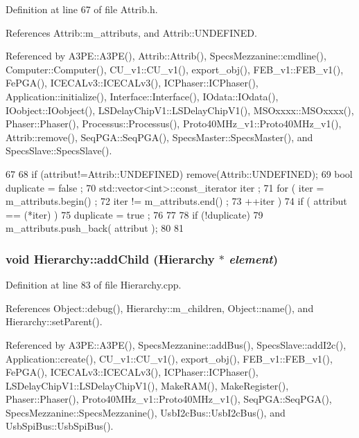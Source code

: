 Definition at line 67 of file Attrib.h.

References Attrib::m\_\-attributs, and Attrib::UNDEFINED.

Referenced by A3PE::A3PE(), Attrib::Attrib(), SpecsMezzanine::cmdline(), Computer::Computer(), CU\_\-v1::CU\_\-v1(), export\_\-obj(), FEB\_\-v1::FEB\_\-v1(), FePGA(), ICECALv3::ICECALv3(), ICPhaser::ICPhaser(), Application::initialize(), Interface::Interface(), IOdata::IOdata(), IOobject::IOobject(), LSDelayChipV1::LSDelayChipV1(), MSOxxxx::MSOxxxx(), Phaser::Phaser(), Processus::Processus(), Proto40MHz\_\-v1::Proto40MHz\_\-v1(), Attrib::remove(), SeqPGA::SeqPGA(), SpecsMaster::SpecsMaster(), and SpecsSlave::SpecsSlave().


\begin{DoxyCode}
67                             {
68     if (attribut!=Attrib::UNDEFINED) remove(Attrib::UNDEFINED);
69     bool duplicate = false ;
70     std::vector<int>::const_iterator iter ;
71     for ( iter  = m_attributs.begin() ;
72           iter != m_attributs.end()   ;
73           ++iter ) {
74       if ( attribut == (*iter) ) {
75         duplicate = true ;
76       }
77     }
78     if (!duplicate) {
79       m_attributs.push_back( attribut );
80     }
81   }
\end{DoxyCode}
\hypertarget{classHierarchy_ad677774ff38fcb257c04a3a10d471fac}{
\subsubsection[{addChild}]{\setlength{\rightskip}{0pt plus 5cm}void Hierarchy::addChild ({\bf Hierarchy} $\ast$ {\em element})}}
\label{classHierarchy_ad677774ff38fcb257c04a3a10d471fac}


Definition at line 83 of file Hierarchy.cpp.

References Object::debug(), Hierarchy::m\_\-children, Object::name(), and Hierarchy::setParent().

Referenced by A3PE::A3PE(), SpecsMezzanine::addBus(), SpecsSlave::addI2c(), Application::create(), CU\_\-v1::CU\_\-v1(), export\_\-obj(), FEB\_\-v1::FEB\_\-v1(), FePGA(), ICECALv3::ICECALv3(), ICPhaser::ICPhaser(), LSDelayChipV1::LSDelayChipV1(), MakeRAM(), MakeRegister(), Phaser::Phaser(), Proto40MHz\_\-v1::Proto40MHz\_\-v1(), SeqPGA::SeqPGA(), SpecsMezzanine::SpecsMezzanine(), UsbI2cBus::UsbI2cBus(), and UsbSpiBus::UsbSpiBus().



